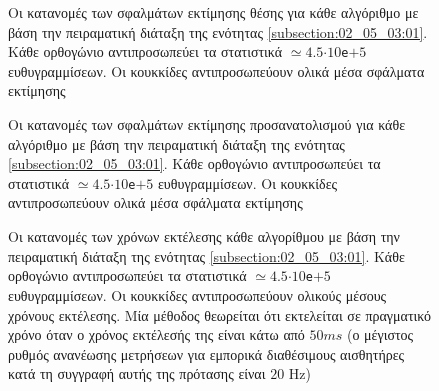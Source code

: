 \begin{figure}\vspace{1cm}\hspace{0.5cm}
  
  \vspace{-4cm}
  \caption{\small Οι κατανομές των σφαλμάτων εκτίμησης θέσης για κάθε αλγόριθμο
           με βάση την πειραματική διάταξη της ενότητας
           \ref{subsection:02_05_03:01}. Κάθε ορθογώνιο αντιπροσωπεύει τα
           στατιστικά $\simeq 4.5$$\cdot$$10$\texttt{e}$+$$5$ ευθυγραμμίσεων.
           Οι κουκκίδες αντιπροσωπεύουν ολικά μέσα σφάλματα εκτίμησης}
  \label{fig:02_05_03:02:01}
\end{figure}

\begin{figure}\vspace{1cm}\hspace{0.5cm}
  
  \vspace{-4cm}
  \caption{\small Οι κατανομές των σφαλμάτων εκτίμησης προσανατολισμού για κάθε
           αλγόριθμο με βάση την πειραματική διάταξη της ενότητας
           \ref{subsection:02_05_03:01}. Κάθε ορθογώνιο αντιπροσωπεύει τα
           στατιστικά $\simeq 4.5$$\cdot$$10$\texttt{e}$+$$5$ ευθυγραμμίσεων.
           Οι κουκκίδες αντιπροσωπεύουν ολικά μέσα σφάλματα εκτίμησης}
  \label{fig:02_05_03:02:02}
\end{figure}

\begin{figure}\vspace{1cm}\hspace{0.5cm}
  
  \vspace{-4cm}
  \caption{\small Οι κατανομές των χρόνων εκτέλεσης κάθε
           αλγορίθμου με βάση την πειραματική διάταξη της ενότητας
           \ref{subsection:02_05_03:01}. Κάθε ορθογώνιο αντιπροσωπεύει τα
           στατιστικά $\simeq 4.5$$\cdot$$10$\texttt{e}$+$$5$ ευθυγραμμίσεων.
           Οι κουκκίδες αντιπροσωπεύουν ολικούς μέσους χρόνους εκτέλεσης.
           Μία μέθοδος θεωρείται ότι εκτελείται σε πραγματικό χρόνο όταν ο
           χρόνος εκτέλεσής της είναι κάτω από $50ms$ (ο μέγιστος ρυθμός
           ανανέωσης μετρήσεων για εμπορικά διαθέσιμους αισθητήρες κατά τη
           συγγραφή αυτής της πρότασης είναι $20$ Hz)}
  \label{fig:02_05_03:02:03}
\end{figure}

